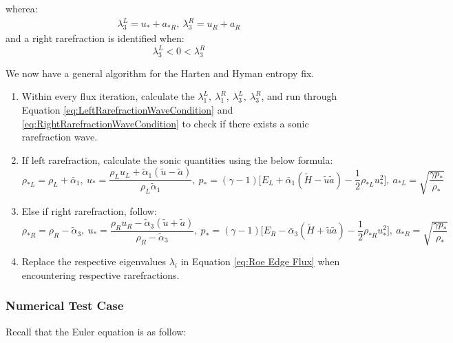 \documentclass[a4paper]{article}
\numberwithin{equation}{section}
\begin{document}
wherea:
\begin{equation}
    \begin{split}
        \lambda_3^L = u_* + a_{*R}, \ \lambda_3^R = u_R + a_R
    \end{split}
\end{equation}
and a right rarefraction is identified when:
\begin{equation}\label{eq:RightRarefractionWaveCondition}
    \lambda_3^L < 0 < \lambda_3^R
\end{equation}

We now have a general algorithm for the Harten and Hyman entropy fix.
\begin{enumerate}
    \item Within every flux iteration, calculate the $\lambda_1^L, \ \lambda_1^R, \ \lambda_3^L, \ \lambda_3^R$, and run through Equation \ref{eq:LeftRarefractionWaveCondition} and \ref{eq:RightRarefractionWaveCondition} to check if there exists a sonic rarefraction wave.
    \item If left rarefraction, calculate the sonic quantities using the below formula:
    \begin{equation}
        \rho_{*L} = \rho_L + \bar{\alpha}_1, \ u_* = \frac{\rho_L u_L + \tilde{\alpha}_1 (\tilde{u} - \tilde{a})}{\rho_L \tilde{\alpha}_1} ,\ p_{*} = (\gamma - 1) \bigg[E_L + \bar{\alpha}_1 (\tilde{H}- \tilde{u} \tilde{a}) - \frac{1}{2} \rho_{*L} u_*^2\bigg], \ a_{*L} = \sqrt{\frac{\gamma p_*}{\rho_{*}}}
    \end{equation}
    \item Else if right rarefraction, follow:
    \begin{equation}
        \rho_{*R} = \rho_R - \tilde{\alpha}_3, \ 
        u_* = \frac{\rho_R u_R - \tilde{\alpha}_3 (\tilde{u} + \tilde{a})}{\rho_R -  \tilde{\alpha}_3} ,\ 
        p_{*} = (\gamma - 1) \bigg[E_R - \bar{\alpha}_3 (\tilde{H} + \tilde{u} \tilde{a}) - \frac{1}{2} \rho_{*R} u_*^2\bigg], \ 
        a_{*R} = \sqrt{\frac{\gamma p_*}{\rho_{*}}}
    \end{equation}
    \item Replace the respective eigenvalues $\lambda_i$ in Equation \ref{eq:Roe Edge Flux} when encountering respective rarefractions.
\end{enumerate}

\subsubsection{Numerical Test Case}
Recall that the Euler equation is as follow:
\end{document}
